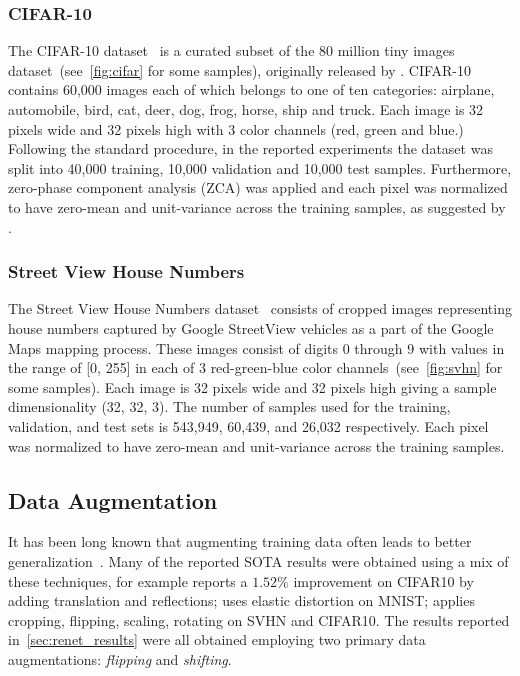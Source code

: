 \subsubsection{CIFAR-10}
The CIFAR-10 dataset~\citep{KrizhevskyHinton2009} is a curated subset of the 80
million tiny images dataset~(see~\autoref{fig:cifar} for some samples),
originally released by \citet{Torralba+Fergus+Freeman-2008}. CIFAR-10 contains
60,000 images each of which belongs to one of ten categories: airplane,
automobile, bird, cat, deer, dog, frog, horse, ship and truck. Each image is 32
pixels wide and 32 pixels high with 3 color channels (red, green and blue.)
Following the standard procedure, in the reported experiments the dataset
was split into 40,000 training, 10,000 validation and 10,000 test samples.
Furthermore, zero-phase component analysis (ZCA) was applied and each pixel
was normalized to have zero-mean and unit-variance across the training samples,
as suggested by \citet{KrizhevskyHinton2009}.

\subsubsection{Street View House Numbers}
The Street View House Numbers dataset~\citep{Netzer-wkshp-2011} consists
of cropped images representing house numbers captured by Google StreetView
vehicles as a part of the Google Maps mapping process. These images consist of
digits 0 through 9 with values in the range of [0, 255] in each of 3
red-green-blue color channels~(see~\autoref{fig:svhn} for some samples). Each
image is 32 pixels wide and 32 pixels high giving a sample dimensionality (32,
32, 3). The number of samples used for the training, validation, and test sets
is 543,949, 60,439, and 26,032 respectively. Each pixel was normalized to have
zero-mean and unit-variance across the training samples.

\subsection{Data Augmentation}

It has been long known that augmenting training data often leads to better
generalization~\citep[see, e.g.,][]{Krizhevsky-2012}. Many of the reported
SOTA results were obtained using a mix of these techniques, for example
\citep{Goodfellow2013} reports a $1.52\%$ improvement on CIFAR10 by adding
translation and reflections; \citep{DBLP:conf/icdar/SimardSP03} uses elastic
distortion on MNIST; \citep{DBLP:conf/icml/WanZZLF13} applies cropping,
flipping, scaling, rotating on SVHN and CIFAR10. The results reported
in~\autoref{sec:renet_results} were all obtained employing two primary data
augmentations: {\it flipping} and {\it shifting}.

